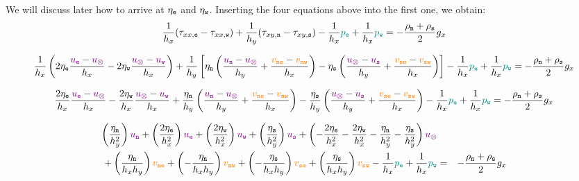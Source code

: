 We will discuss later how to arrive at $\eta_{\tt e}$ and $\eta_{\tt w}$.
Inserting the four equations above into the first one, we obtain:
\[
  \frac{1}{h_x} (\tau_{xx,{\tt e}}-\tau_{xx,{\tt w}}) 
+ \frac{1}{h_y} (\tau_{xy,{\tt n}}-\tau_{xy,{\tt s}})
-\frac{1}{h_x} {\color{teal}p_{\tt e}} + \frac{1}{h_x} {\color{teal}p_{\tt w}}
= -\frac{\rho_{\tt n}+\rho_{\tt s}}{2} g_x
\]

{\footnotesize
\[
\frac{1}{h_x} 
\left(  2\eta_{\tt e} \frac{{\color{violet} u_{\tt e}}-{\color{violet} u_\otimes}}{h_x} -  2\eta_{\tt w} \frac{{\color{violet} u_\otimes}-{\color{violet} u_{\tt w}}}{h_x}\right)
+ \frac{1}{h_y} \left[  
\eta_{\tt n} \left( \frac{{\color{violet} u_{\tt n}}-{\color{violet} u_\otimes}}{h_y} +\frac{{\color{orange} v_{\tt ne}}-{\color{orange} v_{\tt nw}}}{h_x} \right)
-
\eta_{\tt s} \left( \frac{{\color{violet} u_\otimes}-{\color{violet} u_{\tt s}}}{h_y} +\frac{{\color{orange} v_{\tt se}}-{\color{orange} v_{\tt sw}}}{h_x} \right) 
\right]
-\frac{1}{h_x} {\color{teal} p_{\tt e}} + \frac{1}{h_x}{\color{teal}p_{\tt w}}
= -\frac{\rho_{\tt n}+\rho_{\tt s}}{2} g_x
\]
}

{\footnotesize
\[
\frac{2\eta_{\tt e}}{h_x}    
\frac{{\color{violet} u_{\tt e}}-{\color{violet} u_\otimes}}{h_x} 
-  \frac{2\eta_{\tt w}}{h_x} \frac{{\color{violet} u_\otimes}-{\color{violet} u_{\tt w}}}{h_x}
+ \frac{\eta_{\tt n}}{h_y}  
 \left( \frac{{\color{violet} u_{\tt n}}-{\color{violet} u_\otimes}}{h_y} +\frac{{\color{orange} v_{\tt ne}}-{\color{orange} v_{\tt nw}}}{h_x} \right)
- \frac{\eta_{\tt s}}{h_y} 
 \left( \frac{{\color{violet} u_\otimes}-{\color{violet} u_{\tt s}}}{h_y} +\frac{{\color{orange} v_{\tt se}}-{\color{orange} v_{\tt sw}}}{h_x} \right) 
-\frac{1}{h_x} {\color{teal}p_{\tt e}} + \frac{1}{h_x} {\color{teal}p_{\tt w}}
= -\frac{\rho_{\tt n}+\rho_{\tt s}}{2} g_x
\]
}


\begin{mdframed}[backgroundcolor=blue!5]
\begin{eqnarray}
\left( \frac{\eta_{\tt n}}{h_y^2} \right) {\color{violet} u_{\tt n}} + 
\left( \frac{2\eta_{\tt e}}{h_x^2} \right) {\color{violet} u_{\tt e}} + 
\left( \frac{2\eta_{\tt w}}{h_x^2} \right) {\color{violet} u_{\tt w}} + 
\left( \frac{\eta_{\tt s}}{h_y^2} \right) {\color{violet} u_{\tt s}} + 
\left( -\frac{2\eta_{\tt e}}{h_x^2} -\frac{2\eta_{\tt w}}{h_x^2}  
-\frac{\eta_{\tt n}}{h_y^2} -\frac{\eta_{\tt s}}{h_y^2}  
\right) {\color{violet} u_\otimes} \nonumber\\
+
\left( \frac{\eta_{\tt n}}{h_x h_y} \right) {\color{orange} v_{\tt ne}}+ 
\left(-\frac{\eta_{\tt n}}{h_x h_y} \right) {\color{orange} v_{\tt nw}}+ 
\left(-\frac{\eta_{\tt s}}{h_x h_y} \right) {\color{orange} v_{\tt se}}+ 
\left( \frac{\eta_{\tt s}}{h_x h_y} \right) {\color{orange} v_{\tt sw}} 
- \frac{1}{h_x} {\color{teal}p_{\tt e}} + \frac{1}{h_x} {\color{teal}p_{\tt w}} 
&=& -\frac{\rho_{\tt n}+\rho_{\tt s}}{2} g_x \nonumber\\
\label{eq:fdmstokes1}
\end{eqnarray}
\end{mdframed}




